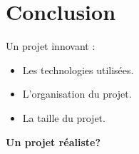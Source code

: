 \section*{Conclusion}

\begin{frame}
Un projet innovant :
\begin{itemize}
\item Les technologies utilis\'ees.
\item L'organisation du projet.
\item La taille du projet.
\end{itemize}
\pause
\begin{center}
\textbf{Un projet r\'ealiste?}
\end{center}
\end{frame}